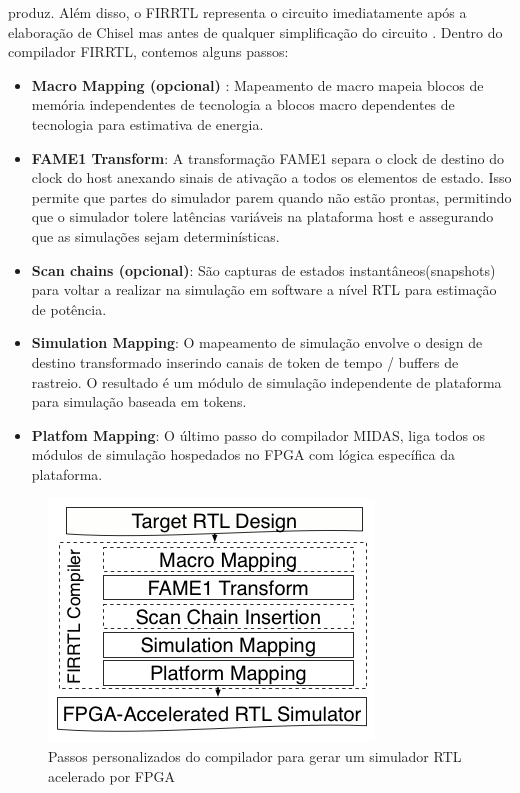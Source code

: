 \documentclass[conference]{IEEEtran}
\begin{document}
	produz. Além disso, o FIRRTL representa o circuito imediatamente após a elaboração de Chisel mas antes de qualquer simplificação do circuito \cite{b10}. Dentro do compilador FIRRTL, contemos alguns passos:
	 \begin{itemize}
	 	\item \textbf{Macro Mapping (opcional)} : Mapeamento de macro mapeia blocos de memória independentes de tecnologia
	 	a blocos macro dependentes de tecnologia para estimativa de energia.
	 	\item \textbf{FAME1 Transform}: A transformação FAME1 separa o clock de destino do clock do host anexando sinais de ativação a todos os elementos de estado. Isso permite que partes do simulador parem quando não estão prontas, permitindo que o simulador tolere latências variáveis na plataforma host e assegurando que as simulações sejam determinísticas.
	 	\item \textbf{Scan chains (opcional)}: São capturas de estados instantâneos(snapshots) para voltar a realizar na simulação em software a nível RTL para estimação de potência.  
	 	\item \textbf{Simulation Mapping}: O mapeamento de simulação envolve o design de destino transformado inserindo canais de token de tempo / buffers de rastreio. O resultado é um módulo de simulação independente de plataforma para simulação baseada em tokens.
	 	\item \textbf{Platfom Mapping}: O último passo do compilador MIDAS, liga todos os módulos de simulação hospedados no FPGA com lógica específica da plataforma.
	 \end{itemize}
	
		\begin{figure}[htbp]
		\centerline{\includegraphics[scale=1.4]{fig4.png}}
		\caption{Passos personalizados do compilador para gerar um simulador RTL acelerado por FPGA
		}
		
		\label{Midas Arch}
	\end{figure}
	
\end{document}
